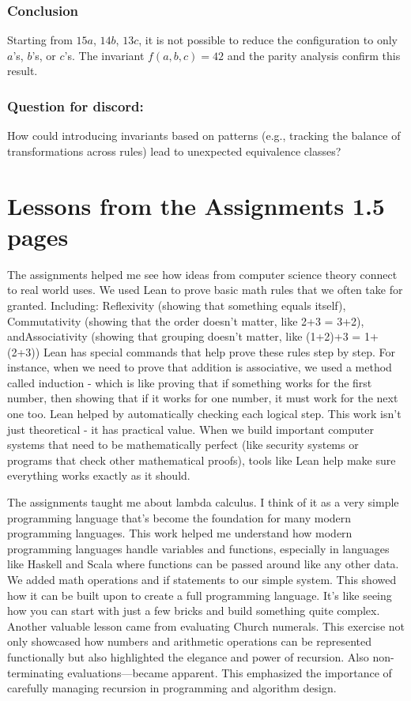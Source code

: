 \documentclass{article}
\theoremstyle{theorem}
\theoremstyle{definition}
\theoremstyle{remark}
\begin{document}
\subsubsection*{Conclusion}
Starting from \( 15a \), \( 14b \), \( 13c \), it is not possible to reduce the configuration to only \( a \)'s, \( b \)'s, or \( c \)'s. The invariant \( f(a, b, c) = 42 \) and the parity analysis confirm this result.




\subsubsection*{Question for discord:}
How could introducing invariants based on patterns (e.g., tracking the balance of transformations across rules) lead to unexpected equivalence classes?
  

\section{Lessons from the Assignments 1.5 pages}

The assignments helped me see how ideas from computer science theory connect to real world uses. 
We used Lean to prove basic math rules that we often take for granted. Including: Reflexivity
(showing that something equals itself), Commutativity (showing that the order doesn't matter, 
like 2+3 = 3+2), andAssociativity (showing that grouping doesn't matter, like (1+2)+3 = 1+(2+3))
Lean has special commands that help prove these rules step by step. For instance, when we need 
to prove that addition is associative, we used a method called induction - which is like proving 
that if something works for the first number, then showing that if it works for one number, it 
must work for the next one too. Lean helped by automatically checking each logical step. This 
work isn't just theoretical - it has practical value. When we build important computer systems 
that need to be mathematically perfect (like security systems or programs that check other 
mathematical proofs), tools like Lean help make sure everything works exactly as it should.

The assignments taught me about lambda calculus. I think of it as a very simple programming language 
that's become the foundation for many modern programming languages. This work helped me understand 
how modern programming languages handle variables and functions, especially in languages like Haskell 
and Scala where functions can be passed around like any other data. We added math operations and if 
statements to our simple system. This showed how it can be built upon to create a full programming 
language. It's like seeing how you can start with just a few bricks and build something quite complex. 
Another valuable lesson came from evaluating Church numerals. This exercise not only showcased how 
numbers and arithmetic operations can be represented functionally but also highlighted the elegance 
and power of recursion. Also non-terminating evaluations—became apparent. This emphasized the 
importance of carefully managing recursion in programming and algorithm design.
\end{document}
